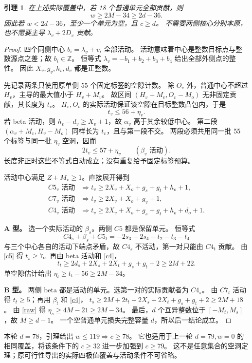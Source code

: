 \documentclass[11pt,a4paper]{article}
\newcommand{\Z}{\mathbb Z}
\newtheorem{lemma}[theorem]{引理}
\begin{document}
\begin{lemma}\label{lem:noempty}
在上述实际覆盖中，若 18 个普通单元全部贡献，则
\[w\ge2M-34\ge2d-36.\]
因此若 $w<2d-36$，至少一个单元为空，且 $c\ge d$。
不需要两侧核心分别本原，也不需要主导 $\lambda_v+2D_v$ 贡献。
\end{lemma}
\begin{proof}
四个同侧中心 $b_i=\lambda_v+v_i$ 全部活动。
活动意味着中心是整数目标点与整数源点之差；故 $b_i\in\Z$。
恒等式 $\lambda_v=-b_1+b_2+b_3+b_4$ 给出全部外侧点的整性。
因此 $X_v,g_v,h_v,d_v$ 都是正整数。

先记录两条只使用原单侧 55 个固定标签的空隙计数。
除 $O_v$ 外，普通中心不超过 $H_v$，主导的最大值小于 $H_v+M_v$。
故区间 $(H_v+M_v,O_v-M_o)$ 无非固定贡献，其长度为 $t_v$。
$H_v,O_v$ 的实际活动保证该空隙在目标整数凸包内，于是
\[t_v\le56+\eta_v.\]
若 beta 活动，则 $h_v-d_v\ge X_v+1$，故 $\alpha_v$ 高于其余较低中心。
第二段 $(\alpha_v+M_v,H_v-M_o)$ 同样长为 $t_v$，且与第一段不交。
两段必须共用同一批 55 个标签与同一批 $\eta_v$ 空洞，因而
\begin{equation}\label{raw}
2t_v\le57+\eta_v\qquad(\beta_v\text{ 活动}).
\end{equation}
长度非正时这些不等式自动成立；没有重复给予固定标签预算。

活动中心满足 $Z+M_v\ge1$。直接展开得到
\begin{align}
C5_v\text{ 活动}&\Rightarrow
t_v\ge2X_v+X_o+g_s+g_t+h_o+1,\label{c5}\\
C7_v\text{ 活动}&\Rightarrow t_v\ge2X_v+X_o+g_v+1,\label{c7}\\
C4_v\text{ 活动}&\Rightarrow
t_v\ge2X_v+X_o+g_s+g_t+h_o+d_o+1.\label{c4}
\end{align}

\textbf{A 型。} 选一个实际活动的 $\beta_s$。两侧 $C5$ 都是保留单元。
恒等式
\[C4_s+\beta_s+C5_t=-2s_3-2s_4-t_2-t_3-t_4\]
与三个中心各自的活动下端点矛盾，故 $C4_s$ 不活动，第一对只能由 $C4_t$ 贡献。
由 \eqref{c5} 得 $t_s\ge7$。再由 beta 活动和 \eqref{c4}，
\[
t_t\ge2d_s+2X_s+2X_t+g_s+g_t+2
\ge2M+22.
\]
单空隙估计给出 $\eta_t\ge t_t-56\ge2M-34$。

\textbf{B 型。} 两侧 beta 都是活动的单元。选第一对的实际贡献者为 $C4_s$。
由 $C7_t$ 活动得 $t_t\ge5$；再用 $\beta_t$ 和 \eqref{c4}，
$t_s\ge2M+2t_t+2X_s+2X_t+g_s+g_t+2\ge2M+18$。
由 \eqref{raw} 得 $\eta_s\ge4M-21\ge2M-34$。
最后，$d$ 个互异整数位于 $[-M_t,M_s]$，故 $M\ge d-1$。
一个空普通单元损失完整容量 $d$，所以后一结论成立。
\end{proof}

本轮 $d=78$，引理给出 $w\le119\Rightarrow c\ge78$。
它也适用于上一轮 $d=79,w=0$ 的相同覆盖，将该条件下的 $c\ge32$ 进一步加强到 $c\ge79$。
这不是任意集合的空洞定理；原可行性导出的实际四极值覆盖与活动条件不可省略。
\end{document}
